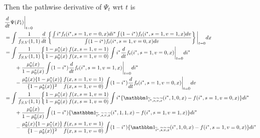 \documentclass{article}
\begin{document}
Then the pathwise derivative of $\Psi_t$ wrt $t$ is
\begin{align*}
   &\frac{d}{dt} \Psi(P_t)\bigg\vert_{t=0} \\
   &= \int \dfrac{1}{f_{S,V}(1, 1)} \frac{d}{dt} \left\{\dfrac{\int i^* f_t(i^*, s=1,v=0,x)di^* \int (1 - i^*)  f_t(i^*, s=1, v=1, x)dv}{\int(1 - i^*)  f_t(i^*, s=1, v=0, x)dv} \right\} \bigg\vert_{t=0}dx \\
   &= \int \dfrac{1}{f_{S,V}(1, 1)}\bigg\{ \dfrac{1 - \mu^*_1(x)}{1-\mu^*_0(x)} \dfrac{f(x, s=1, v=1)}{f(x, s=1, v=0)}\int i^* \frac{d}{dt} f_t(i^*, s=1,v=0,x) \bigg\vert_{t=0} di^* \\
   &\qquad + \dfrac{\mu^*_0(x)}{1 - \mu^*_0(x)} \int (1-i^*) \frac{d}{dt}f_t(i^*, s=1, v=1, x) \bigg\vert_{t=0} di^* \\ 
   &\qquad - \dfrac{\mu^*_0(x)\{1 - \mu^*_1(x)\}}{\{1 - \mu^*_0(x)\}^2} \dfrac{f(x, s=1, v=1)}{f(x, s=1, v =0)} \int (1-i^*) \frac{d}{dt}f_t(i^*, s=1, v=0, x) \bigg\vert_{t=0} dv \\
   &= \int \dfrac{1}{f_{S,V}(1, 1)}\bigg\{  \dfrac{1 - \mu^*_1(x)}{1-\mu^*_0(x)} \dfrac{f(x, s=1, v=1)}{f(x, s=1, v=0)}\int i^* \{ \mathbbm 1_{\widetilde i^*, \widetilde s, \widetilde v, \widetilde x}(i^*, 1, 0, x) - f(i^*, s=1,v=0,x) \} di^* \\
   &\qquad + \dfrac{\mu^*_0(x)}{1-\mu^*_0(x)} \int (1 - i^*) \{\mathbbm 1_{\widetilde i^*, \widetilde s, \widetilde v, \widetilde x}(i^*, 1, 1, x) - f(i^*, s=1, v=1, x) \} di^* \\ 
   &\qquad -\dfrac{\mu^*_0(x)\{1 - \mu^*_1(x)\}}{\{1 - \mu^*_0(x)\}^2} \dfrac{f(x, s=1, v=1)}{f(x, s=1, v =0)} \int (1 - i^*) \{\mathbbm 1_{\widetilde i^*, \widetilde s, \widetilde v, \widetilde x}(i^*, 1, 0, x) - f(i^*, s=1, v=0, x) \} di^*  \\

\end{align*}
\end{document}
